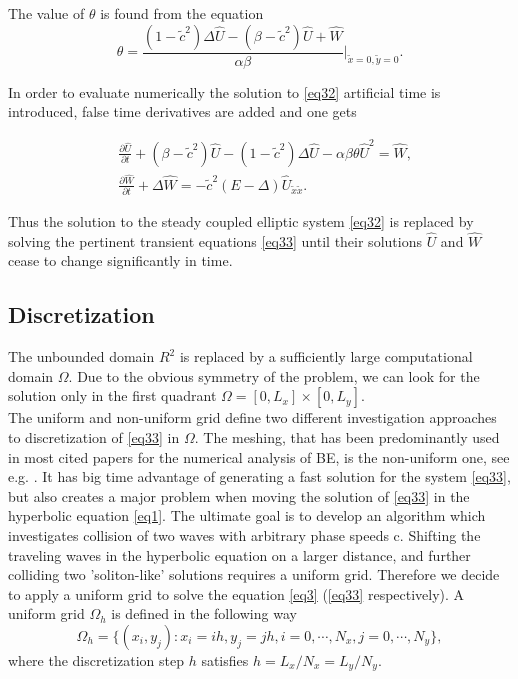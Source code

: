 \documentclass[12pt]{article}
\theoremstyle{theorem}
\theoremstyle{defi}
\begin{document}
The value of $\theta $ is found from the  equation 
\begin{equation}\label{eqtheta}
\theta = \frac{ (1-\tilde c^2 )\Delta \widehat{U} - (\beta-\tilde c^2) \widehat{U} +\widehat{W}}{\alpha \beta} |_{\tilde x=0,\tilde y=0} .
\end{equation}

In order to evaluate numerically the solution to \eqref{eq32} artificial time is introduced, false time derivatives are added and one gets

\begin{equation}\label{eq33}
\begin{split}
&\frac {\partial \widehat{U}}{\partial t} + (\beta-\tilde c^2) \widehat{U} - (1-\tilde c^2 ) \Delta \widehat{U} - \alpha \beta \theta \widehat{U}^2 = \widehat{W}, \\
&\frac {\partial \widehat{W}}{\partial t} + \Delta \widehat{W} = - \tilde c^2 (E- \Delta) \widehat{U}_{\tilde x \tilde x}. 
\end{split}
\end{equation}

Thus the solution to the steady coupled elliptic system \eqref{eq32} is replaced by solving the pertinent transient equations \eqref{eq33} until their solutions $\widehat{U}$ and $\widehat{W}$ cease to change significantly in time. 

\subsection{Discretization}

The unbounded domain $R^2$ is replaced by a sufficiently large computational domain $\Omega$. Due to the obvious symmetry of the problem, we can look for the solution only in the first quadrant $\Omega = [0,L_x] \times[0,L_y]$.
\\
The uniform and non-uniform grid define two different investigation approaches to discretization of \eqref{eq33} in $\Omega$. The meshing, that has been predominantly used in most cited papers for the numerical analysis of BE, is the non-uniform one, see e.g. \cite{ref6}. It has big time advantage of generating a fast solution for the system \eqref{eq33}, but also creates a major problem when moving the solution of \eqref{eq33} in the hyperbolic equation \eqref{eq1}. The ultimate goal is to develop an algorithm which investigates collision of two waves with arbitrary phase speeds c. Shifting the traveling waves in the hyperbolic equation on a larger distance, and further colliding two 'soliton-like' solutions requires a uniform grid. Therefore we decide to apply a uniform grid to solve the equation \eqref{eq3} (\eqref{eq33} respectively).
A uniform grid $\Omega_h$ is defined in the following way
$$
\Omega_h = \{(x_i,y_j): x_i = ih, y_j = jh, i = 0,\cdots ,N_x, j = 0,\cdots , N_y \},
$$
where the discretization step $h$ satisfies
$ h = L_x/N_x = L_y/N_y$. 
\end{document}

